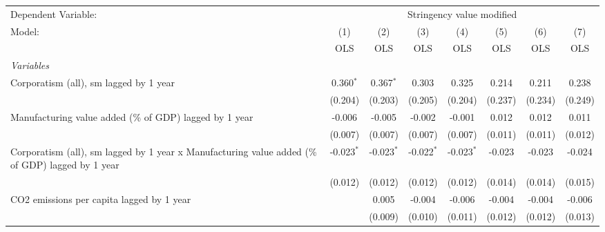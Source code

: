 
\begingroup
\centering
\begin{tabular}{lccccccc}
   \toprule
   Dependent Variable: & \multicolumn{7}{c}{Stringency value modified}\\
   Model:                                                                                           & (1)          & (2)          & (3)          & (4)          & (5)          & (6)          & (7)\\  
                                                                                                    &  OLS         & OLS          & OLS          & OLS          & OLS          & OLS          & OLS\\  
   \midrule
   \emph{Variables}\\
   Corporatism (all), sm lagged by 1 year                                                           & 0.360$^{*}$  & 0.367$^{*}$  & 0.303        & 0.325        & 0.214        & 0.211        & 0.238\\   
                                                                                                    & (0.204)      & (0.203)      & (0.205)      & (0.204)      & (0.237)      & (0.234)      & (0.249)\\   
   Manufacturing value added (\% of GDP) lagged by 1 year                                           & -0.006       & -0.005       & -0.002       & -0.001       & 0.012        & 0.012        & 0.011\\   
                                                                                                    & (0.007)      & (0.007)      & (0.007)      & (0.007)      & (0.011)      & (0.011)      & (0.012)\\   
   Corporatism (all), sm lagged by 1 year x Manufacturing value added (\% of GDP) lagged by 1 year  & -0.023$^{*}$ & -0.023$^{*}$ & -0.022$^{*}$ & -0.023$^{*}$ & -0.023       & -0.023       & -0.024\\   
                                                                                                    & (0.012)      & (0.012)      & (0.012)      & (0.012)      & (0.014)      & (0.014)      & (0.015)\\   
   CO2 emissions per capita lagged by 1 year                                                        &              & 0.005        & -0.004       & -0.006       & -0.004       & -0.004       & -0.006\\   
                                                                                                    &              & (0.009)      & (0.010)      & (0.011)      & (0.012)      & (0.012)      & (0.013)\\   

\end{tabular}
